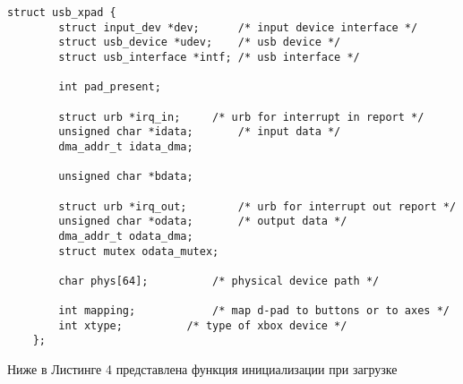 \begin{lstlisting}[caption=Структура usb\_xpad]
	struct usb_xpad {
		struct input_dev *dev;		/* input device interface */
		struct usb_device *udev;	/* usb device */
		struct usb_interface *intf;	/* usb interface */
		
		int pad_present;
		
		struct urb *irq_in;		/* urb for interrupt in report */
		unsigned char *idata;		/* input data */
		dma_addr_t idata_dma;
		
		unsigned char *bdata;
		
		struct urb *irq_out;		/* urb for interrupt out report */
		unsigned char *odata;		/* output data */
		dma_addr_t odata_dma;
		struct mutex odata_mutex;
		
		char phys[64];			/* physical device path */
		
		int mapping;			/* map d-pad to buttons or to axes */
		int xtype;			/* type of xbox device */
	};
\end{lstlisting}

Ниже в Листинге 4 представлена функция инициализации при загрузке

